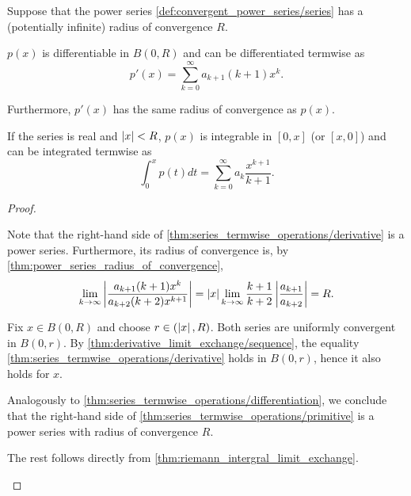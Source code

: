 \begin{theorem}\label{thm:series_termwise_operations}
  Suppose that the power series \cref{def:convergent_power_series/series} has a (potentially infinite) radius of convergence \( R \).

  \begin{defenum}
     \( p(x) \) is differentiable in \( B(0, R) \) and can be differentiated termwise as
    \begin{equation}\label{thm:series_termwise_operations/derivative}
      p'(x) = \sum_{k=0}^\infty a_{k+1} (k+1) x^k.
    \end{equation}

    Furthermore, \( p'(x) \) has the same radius of convergence as \( p(x) \).

     If the series is real and \( \left\vert x \right\vert < R \), \( p(x) \) is integrable in \( [0, x] \) (or \( [x, 0] \)) and can be integrated termwise as
    \begin{equation}\label{thm:series_termwise_operations/primitive}
      \int_0^x p(t) dt = \sum_{k=0}^\infty a_k \frac {x^{k+1}} {k+1}.
    \end{equation}
  \end{defenum}
\end{theorem}
\begin{proof}
  \begin{description}
     Note that the right-hand side of \cref{thm:series_termwise_operations/derivative} is a power series. Furthermore, its radius of convergence is, by \cref{thm:power_series_radius_of_convergence},
    \begin{equation*}
      \lim_{k \to \infty} \left\vert \frac {a_{k+1} (k+1) x^k} {a_{k+2} (k+2) x^{k+1}} \right\vert
      =
      \left\vert x \right\vert \lim_{k \to \infty} \frac {k+1} {k+2} \left\vert \frac {a_{k+1}} {a_{k+2}} \right\vert
      =
      R.
    \end{equation*}

    Fix \( x \in B(0, R) \) and choose \( r \in (\left\vert x \right\vert, R) \). Both series are uniformly convergent in \( B(0, r) \). By \cref{thm:derivative_limit_exchange/sequence}, the equality \cref{thm:series_termwise_operations/derivative} holds in \( B(0, r) \), hence it also holds for \( x \).

     Analogously to \cref{thm:series_termwise_operations/differentiation}, we conclude that the right-hand side of \cref{thm:series_termwise_operations/primitive} is a power series with radius of convergence \( R \).

    The rest follows directly from \cref{thm:riemann_intergral_limit_exchange}.
  \end{description}
\end{proof}
